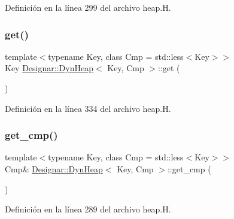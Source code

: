 Definición en la línea 299 del archivo heap.\+H.

\mbox{\label{class_designar_1_1_dyn_heap_adead89301910d07cf6e019ad35b549ad}} 
\subsubsection{\texorpdfstring{get()}{get()}}
{\footnotesize\ttfamily template$<$typename Key, class Cmp = std\+::less$<$\+Key$>$$>$ \\
Key \hyperlink{class_designar_1_1_dyn_heap}{Designar\+::\+Dyn\+Heap}$<$ Key, Cmp $>$\+::get (\begin{DoxyParamCaption}{ }\end{DoxyParamCaption})\hspace{0.3cm}{\ttfamily [inline]}}



Definición en la línea 334 del archivo heap.\+H.

\mbox{\label{class_designar_1_1_dyn_heap_a4f1357b3883f314adbd2b7bb100636b3}} 
\subsubsection{\texorpdfstring{get\+\_\+cmp()}{get\_cmp()}\hspace{0.1cm}{\footnotesize\ttfamily [1/2]}}
{\footnotesize\ttfamily template$<$typename Key, class Cmp = std\+::less$<$\+Key$>$$>$ \\
Cmp\& \hyperlink{class_designar_1_1_dyn_heap}{Designar\+::\+Dyn\+Heap}$<$ Key, Cmp $>$\+::get\+\_\+cmp (\begin{DoxyParamCaption}{ }\end{DoxyParamCaption})\hspace{0.3cm}{\ttfamily [inline]}}



Definición en la línea 289 del archivo heap.\+H.

\mbox{\label{class_designar_1_1_dyn_heap_a2c5b0b169216b30f44cc26338d3866b1}} 
